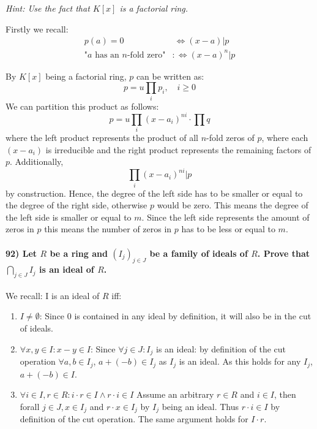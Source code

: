\documentclass[
]{article}
\begin{document}
\emph{Hint: Use the fact that \(K[x]\) is a factorial ring.}

Firstly we recall: \[
\begin{aligned}
p(a) = 0 &\ \Leftrightarrow (x-a) | p\\
\text{"$a$ has an $n$-fold zero"} &:\Leftrightarrow (x-a)^n | p
\end{aligned}
\]

By \(K[x]\) being a factorial ring, \(p\) can be written as: \[
p = u \prod_i p_i, \quad i \geq 0
\] We can partition this product as follows: \[
p = u \prod_i (x-a_i)^{ni} \cdot \prod q
\] where the left product represents the product of all \(n\)-fold zeros
of \(p\), where each \((x-a_i)\) is irreducible and the right product
represents the remaining factors of \(p\). Additionally, \[
\prod_i (x-a_i)^{ni} | p 
\] by construction. Hence, the degree of the left side has to be smaller
or equal to the degree of the right side, otherwise \(p\) would be zero.
This means the degree of the left side is smaller or equal to \(m\).
Since the left side represents the amount of zeros in \(p\) this means
the number of zeros in \(p\) has to be less or equal to \(m\).

\hypertarget{let-r-be-a-ring-and-i_j_j-in-j-be-a-family-of-ideals-of-r.-prove-that-bigcap_j-in-j-i_j-is-an-ideal-of-r.}{%
\paragraph{\texorpdfstring{92) Let \(R\) be a ring and
\((I_j)_{j \in J}\) be a family of ideals of \(R\). Prove that
\(\bigcap_{j \in J} I_j\) is an ideal of
\(R\).}{92) Let R be a ring and (I\_j)\_\{j \textbackslash in J\} be a family of ideals of R. Prove that \textbackslash bigcap\_\{j \textbackslash in J\} I\_j is an ideal of R.}}\label{let-r-be-a-ring-and-i_j_j-in-j-be-a-family-of-ideals-of-r.-prove-that-bigcap_j-in-j-i_j-is-an-ideal-of-r.}}

We recall: I is an ideal of \(R\) iff:

\begin{enumerate}
\def\labelenumi{\arabic{enumi})}
\item
  \(I \neq \emptyset\): Since \(0\) is contained in any ideal by
  definition, it will also be in the cut of ideals.
\item
  \(\forall x,y \in I: x -y \in I\): Since \(\forall j \in J: I_j\) is
  an ideal: by definition of the cut operation \(\forall a,b \in I_j\),
  \(a +(-b) \in I_j\) as \(I_j\) is an ideal. As this holds for any
  \(I_j\), \(a+ (-b) \in I\).
\item
  \(\forall i \in I, r \in R: i \cdot r \in I \land r \cdot i \in I\)
  Assume an arbitrary \(r \in R\) and \(i \in I\), then forall
  \(j \in J, x \in I_j\) and \(r \cdot x \in I_j\) by \(I_j\) being an
  ideal. Thus \(r \cdot i \in I\) by definition of the cut operation.
  The same argument holds for \(I \cdot r\).
\end{enumerate}
\end{document}
